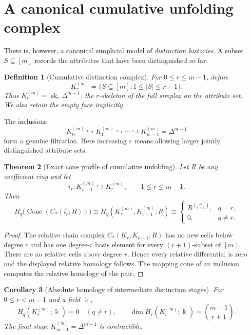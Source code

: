 \documentclass[11pt]{article}
\newtheorem{theorem}{Theorem}[section]
\newtheorem{corollary}[theorem]{Corollary}
\newtheorem{definition}[theorem]{Definition}
\newcommand{\Cone}{\operatorname{Cone}}
\newcommand{\sk}{\operatorname{sk}}
\begin{document}
\section{A canonical cumulative unfolding complex}

There is, however, a canonical simplicial model of \emph{distinction histories}.  A subset $S\subseteq[m]$ records the attributes that have been distinguished so far.

\begin{definition}[Cumulative distinction complex]
For $0\le r\le m-1$, define
\[
K_r^{(m)}=\{S\subseteq[m]:1\le |S|\le r+1\}.
\]
Thus $K_r^{(m)}=\sk_r\Delta^{m-1}$, the $r$-skeleton of the full simplex on the attribute set.  We also retain the empty face implicitly.
\end{definition}

The inclusions
\[
K_0^{(m)}\hookrightarrow K_1^{(m)}\hookrightarrow\cdots\hookrightarrow K_{m-1}^{(m)}=\Delta^{m-1}
\]
form a genuine filtration.  Here increasing $r$ means allowing larger jointly distinguished attribute sets.

\begin{theorem}[Exact cone profile of cumulative unfolding]\label{thm:skeletoncone}
Let $R$ be any coefficient ring and let
\[
i_r:K_{r-1}^{(m)}\hookrightarrow K_r^{(m)},\qquad 1\le r\le m-1.
\]
Then
\[
H_q\bigl(\Cone(C_*(i_r;R))\bigr)
\cong H_q(K_r^{(m)},K_{r-1}^{(m)};R)
\cong
\begin{cases}
R^{\binom{m}{r+1}},&q=r,\\
0,&q\neq r.
\end{cases}
\]
\end{theorem}
\begin{proof}
The relative chain complex $C_*(K_r,K_{r-1};R)$ has no new cells below degree $r$ and has one degree-$r$ basis element for every $(r+1)$-subset of $[m]$.  There are no relative cells above degree $r$.  Hence every relative differential is zero and the displayed relative homology follows.  The mapping cone of an inclusion computes the relative homology of the pair.
\end{proof}

\begin{corollary}[Absolute homology of intermediate distinction stages]
For $0\le r<m-1$ and a field $\Bbbk$,
\[
\widetilde H_q(K_r^{(m)};\Bbbk)=0\quad(q\neq r),
\qquad
\dim\widetilde H_r(K_r^{(m)};\Bbbk)=\binom{m-1}{r+1}.
\]
The final stage $K_{m-1}^{(m)}=\Delta^{m-1}$ is contractible.
\end{corollary}
\end{document}
